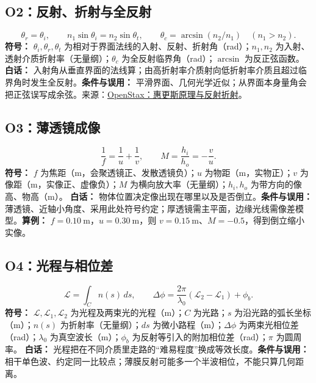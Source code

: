 \subsection{O2：反射、折射与全反射}
\begin{equation}
\theta_r=\theta_i,\qquad n_1\sin\theta_i=n_2\sin\theta_t,\qquad \theta_c=\arcsin(n_2/n_1)\quad(n_1>n_2).
\end{equation}
\textbf{符号：} $\theta_i,\theta_r,\theta_t$ 为相对于界面法线的入射、反射、折射角（rad）；$n_1,n_2$ 为入射、透射介质折射率（无量纲）；$\theta_c$ 为全反射临界角（rad）；$\arcsin$ 为反正弦函数。
\textbf{白话：} 入射角从垂直界面的法线算；由高折射率介质射向低折射率介质且超过临界角时发生全反射。\textbf{条件与误用：} 平滑界面、几何光学近似；从界面本身量角会把正弦误写成余弦。来源：\href{https://openstax.org/books/university-physics-volume-3/pages/1-6-huygenss-principle}{OpenStax：惠更斯原理与反射折射}。

\subsection{O3：薄透镜成像}
\begin{equation}
\frac1f=\frac1u+\frac1v,\qquad M=\frac{h_i}{h_o}=-\frac vu.
\end{equation}
\textbf{符号：} $f$ 为焦距（m，会聚透镜正、发散透镜负）；$u$ 为物距（m，实物正）；$v$ 为像距（m，实像正、虚像负）；$M$ 为横向放大率（无量纲）；$h_i,h_o$ 为带方向的像高、物高（m）。
\textbf{白话：} 物体位置决定像出现在哪里以及是否倒立。\textbf{条件与误用：} 薄透镜、近轴小角度、采用此处符号约定；厚透镜需主平面，边缘光线需像差模型。\textbf{算例：} $f=0.10\ \mathrm m$，$u=0.30\ \mathrm m$，则 $v=0.15\ \mathrm m$、$M=-0.5$，得到倒立缩小实像。

\subsection{O4：光程与相位差}
\begin{equation}
\mathcal L=\int_C n(s)\,ds,\qquad \Delta\phi=\frac{2\pi}{\lambda_0}(\mathcal L_2-\mathcal L_1)+\phi_b.
\end{equation}
\textbf{符号：} $\mathcal L,\mathcal L_1,\mathcal L_2$ 为光程及两束光的光程（m）；$C$ 为光路；$s$ 为沿光路的弧长坐标（m）；$n(s)$ 为折射率（无量纲）；$ds$ 为微小路程（m）；$\Delta\phi$ 为两束光相位差（rad）；$\lambda_0$ 为真空波长（m）；$\phi_b$ 为反射等引入的附加相位差（rad）；$\pi$ 为圆周率。
\textbf{白话：} 光程把在不同介质里走路的“难易程度”换成等效长度。\textbf{条件与误用：} 相干单色波、约定同一比较点；薄膜反射可能多一个半波相位，不能只算几何距离。

